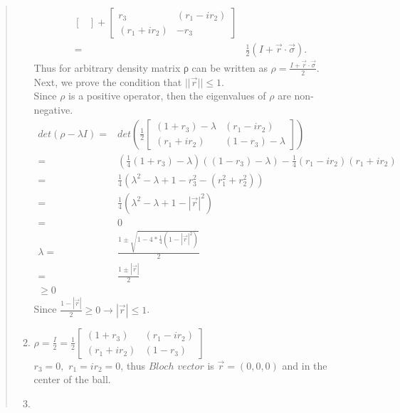 \documentclass[UTF8]{ctexart}
\begin{document}
\begin{quote}
\begin{enumerate}
\begin{equation}
\begin{aligned}
\begin{bmatrix}
		\end{bmatrix}+
		\begin{bmatrix}
			r_{3} &(r_1-ir_{2}) \\
			(r_1+ir_{2}) &-r_{3}
		\end{bmatrix}\\
		=&\frac{1}{2}(I+\vec{r}\cdot \vec{\sigma}).
	\end{aligned}
\end{equation}  
Thus for arbitrary density matrix ρ can be written as $\rho=\frac{I+\vec{r}\cdot \vec{\sigma}}{2}$.\\
Next, we prove the condition that $|| \vec{r}||\leq 1$.
\\
Since $\rho$ is a positive operator, then the eigenvalues of $\rho$ are non-negative.
\begin{equation}
	\begin{aligned}
		det(\rho-\lambda I)=&det\left(\frac{1}{2}\begin{bmatrix}
			(1+r_{3})-\lambda & (r_1-ir_{2}) \\
			(r_1+ir_{2}) & (1-r_{3})-\lambda
		\end{bmatrix}
		\right) \\
		=&(\frac{1}{4}(1+r_{3})-\lambda)((1-r_{3})-\lambda)-\frac{1}{4}(r_1-ir_{2}) (r_1+ir_{2}) \\
		=&\frac{1}{4}(\lambda^{2}-\lambda+1-r_{3}^{2}-(r_{1}^{2}+r_{2}^{2})) \\
		=&\frac{1}{4}(\lambda^{2}-\lambda+1-|\vec{r}|^{2}) \\
		=&0 \\
		\lambda=&\frac{1\pm \sqrt{1-4*\frac{1}{4}(1-|\vec{r}|^{2})}}{2}  \\
			   =&\frac{1\pm |\vec{r}|}{2}  \\
			   \geq 0
	\end{aligned}
\end{equation}
Since $\frac{1- |\vec{r}|}{2} \geq 0 \rightarrow |\vec{r}|\leq 1$.
\item $\rho=\frac{I}{2}=\frac{1}{2}\begin{bmatrix}
	(1+r_{3})& (r_1-ir_{2}) \\
	(r_1+ir_{2}) & (1-r_{3})
\end{bmatrix}$
\\
$r_{3}=0,$ $ r_{1}=ir_{2}=0 $, thus $Bloch$ $ vector$  is $\vec{r}=(0,0,0)$ and in the center of the ball.
\\
\item  \begin{equation}
	\begin{aligned}

\end{aligned}
\end{equation}
\end{enumerate}
\end{quote}
\end{document}
